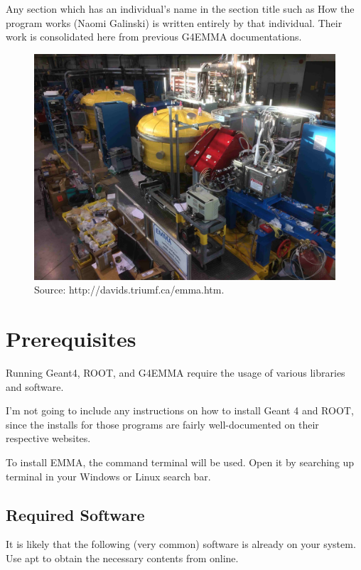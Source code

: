\documentclass{article}
\newcommand{\filefont}[1]{{\fontfamily{pnc}\selectfont #1}\xspace}
\begin{document}
Any section which has an individual's name in the section title such as \filefont{How the program works (Naomi Galinski)} is written entirely by that individual. Their work is consolidated here from previous G4EMMA documentations. 

\begin{figure}[h!]
\centering
\includegraphics[scale=0.1]{EMMA_1dec2016.jpg}  
\caption{Source: http://davids.triumf.ca/emma.htm.}
\label{EMMA}
\end{figure}

\section{Prerequisites}

Running Geant4, ROOT, and G4EMMA require the usage of various libraries and software. 

I'm not going to include any instructions on how to install Geant 4 and ROOT, since the installs for those programs are fairly well-documented on their respective websites. 

To install EMMA, the command terminal will be used. Open it by searching up \filefont{terminal} in your Windows or Linux search bar. 

\subsection{Required Software}

It is likely that the following (very common) software is already on your system. Use \filefont{apt} to obtain the necessary contents from online. 
\end{document}
